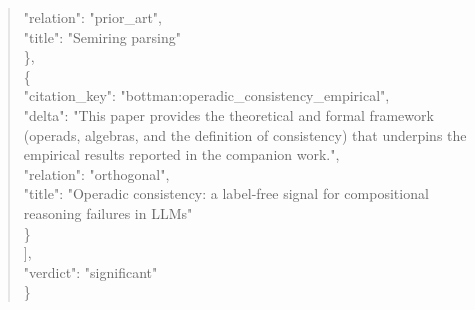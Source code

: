 \documentclass[11pt]{article}
\begin{document}
\begin{quote}
      "relation": "prior\_art",\\
      "title": "Semiring parsing"\\
    \},\\
    \{\\
      "citation\_key": "bottman:operadic\_consistency\_empirical",\\
      "delta": "This paper provides the theoretical and formal framework (operads, algebras, and the definition of consistency) that underpins the empirical results reported in the companion work.",\\
      "relation": "orthogonal",\\
      "title": "Operadic consistency: a label-free signal for compositional reasoning failures in LLMs"\\
    \}\\
  ],\\
  "verdict": "significant"\\
\}\\
\end{quote}
\end{document}

